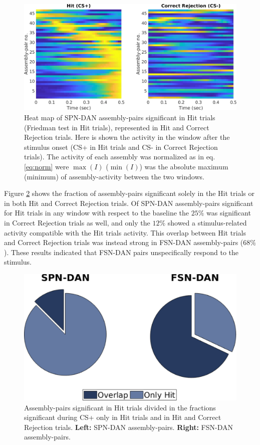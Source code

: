 \begin{figure}[H]
    \centering
    \includegraphics[scale=0.41]{figures/SD_HitCorrRejComp.pdf}
    \caption{Heat map of SPN-DAN assembly-pairs significant in Hit trials (Friedman test in Hit trials), represented in Hit and Correct Rejection trials. Here is shown the activity in the window after the stimulus onset (CS+ in Hit trials and CS- in Correct Rejection trials). The activity of each assembly was normalized as in eq.\ref{eq:norm} were $\max(I)$ ($\min(I)$) was the absolute maximum (minimum) of assembly-activity between the two windows.}
    \label{fig:SD_HitCorrComp}
\end{figure}
Figure \ref{fig:Overlap} shows the fraction of assembly-pairs significant solely in the Hit trials or in both Hit and Correct Rejection trials. Of SPN-DAN assembly-pairs significant for Hit trials in any window  with respect to the baseline the $25\%$ was significant in Correct Rejection trials as well, and only the $12\%$ showed a stimulus-related activity compatible with the Hit trials activity. This overlap between Hit trials and Correct Rejection trials was instead strong in FSN-DAN assembly-pairs ($68\%$). These results indicated that FSN-DAN pairs unspecifically respond to the stimulus. 
\begin{figure}[H]
    \centering
    \includegraphics[scale=0.5]{figures/HItCorrRejPieOverlapSD_FD.pdf}
    \caption{Assembly-pairs significant in Hit trials divided in the fractions significant during CS+ only in Hit trials and in Hit and Correct Rejection trials. \textbf{Left:} SPN-DAN assembly-pairs. \textbf{Right:} FSN-DAN assembly-pairs.}
    \label{fig:Overlap}
\end{figure}

